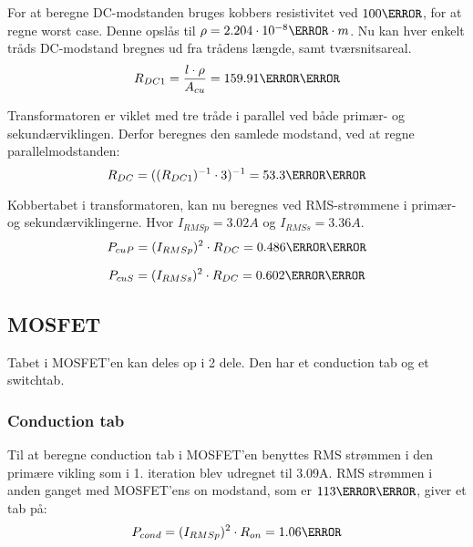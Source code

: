 For at beregne DC-modstanden bruges kobbers resistivitet ved $100\degreeCelsius$, for at regne worst case. Denne opslås til $\rho=2.204\cdot 10^{-8}\ohm \cdot m$. Nu kan hver enkelt tråds DC-modstand bregnes ud fra trådens længde, samt tværsnitsareal.
\begin{equation} \label{dc1-modstand}
R_{DC1} = \frac{l \cdot \rho}{A_{cu}} = 159.91\milli\ohm
\end{equation}

Transformatoren er viklet med tre tråde i parallel ved både primær- og sekundærviklingen. Derfor beregnes den samlede modstand, ved at regne parallelmodstanden:
\begin{equation} \label{dc-modstand}
R_{DC} = ((R_{DC1})^{-1} \cdot 3)^{-1} = 53.3\milli\ohm
\end{equation}

Kobbertabet i transformatoren, kan nu beregnes ved RMS-strømmene i primær- og sekundærviklingerne. Hvor $I_{RMSp} = 3.02A$ og $I_{RMSs} = 3.36A$.
\begin{equation} \label{dc-tab-pri}
P_{cuP} = (I_{RMSp})^2 \cdot R_{DC} = 0.486\milli\watt
\end{equation}

\begin{equation} \label{dc-tab-sek}
P_{cuS} = (I_{RMSs})^2 \cdot R_{DC} = 0.602\milli\watt
\end{equation}

\subsection{MOSFET}
Tabet i MOSFET'en kan deles op i 2 dele. Den har et conduction tab og et switchtab. 

\subsubsection{Conduction tab}
Til at beregne conduction tab i MOSFET'en benyttes RMS strømmen i den primære vikling som i 1. iteration blev udregnet til 3.09A. RMS strømmen i anden ganget med MOSFET'ens on modstand, som er $113\milli \ohm$, giver et tab på:
\begin{equation} \label{P_con}
P_{cond} = (I_{RMSp})^2 \cdot R_{on} = 1.06\watt
\end{equation}


